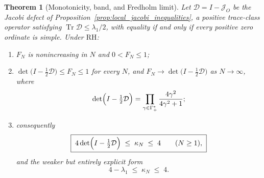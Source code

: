 \documentclass[preprint,12pt]{elsarticle}
\numberwithin{equation}{section}
\theoremstyle{plain}
\newtheorem{theorem}{Theorem}[section]
\theoremstyle{definition}
\theoremstyle{remark}
\newcommand{\RH}{\mathrm{RH}}
\newcommand{\Tr}{\operatorname{Tr}}
\begin{document}
\begin{theorem}[Monotonicity, band, and Fredholm limit]
\label{thm:margin_band}
Let $\mathcal D=I-\mathcal J_O$ be the Jacobi defect of Proposition~\ref{prop:local_jacobi_inequalities},
a positive trace-class operator satisfying $\Tr\mathcal D\le\lambda_1/2$, with equality if and only if every positive zero ordinate is simple.  Under $\RH$:
\begin{enumerate}[label=(\roman*)]
\item $F_N$ is nonincreasing in $N$ and $0<F_N\le1$;
\item $\det\bigl(I-\tfrac12\mathcal D\bigr)\le F_N\le1$ for every $N$, and
      $F_N\to\det\bigl(I-\tfrac12\mathcal D\bigr)$ as $N\to\infty$, where
      \begin{equation}
       \det\Bigl(I-\tfrac12\mathcal D\Bigr)
       =\prod_{\gamma\in\Gamma_+^*}\frac{4\gamma^2}{4\gamma^2+1};
       \label{eq:Fredholm_at_half}
      \end{equation}
\item consequently
      \begin{equation}
       \boxed{\;
       4\det\Bigl(I-\tfrac12\mathcal D\Bigr)\;\le\;\kappa_N\;\le\;4
       \qquad(N\ge1),\;}
       \label{eq:margin_band}
      \end{equation}
      and the weaker but entirely explicit form
      \begin{equation}
       4-\lambda_1\;\le\;\kappa_N\;\le\;4 .
       \label{eq:margin_band_explicit}
      \end{equation}
\end{enumerate}
\end{theorem}
\end{document}
